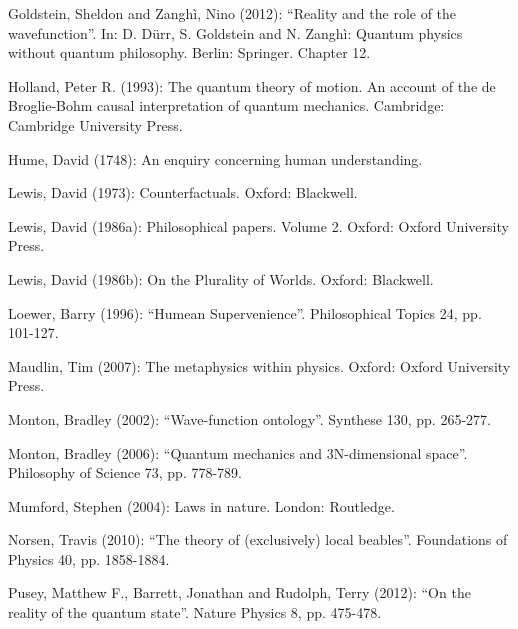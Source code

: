 \documentclass[12pt,a4paper]{article}
\theoremstyle{definition}
\begin{document}
{\vspace{0.3cm}   \noindent  Goldstein, Sheldon and Zangh\`i, Nino (2012): ``Reality and the role of the wavefunction''. In: D. D\"urr, S. Goldstein and N. Zangh\`i: Quantum physics without quantum philosophy. Berlin: Springer. Chapter 12.

\vspace{0.3cm}   \noindent  Holland, Peter R. (1993): The quantum theory of motion. An account of the de Broglie-Bohm causal interpretation of quantum mechanics. Cambridge: Cambridge University Press. 

\vspace{0.3cm}   \noindent  Hume, David (1748): An enquiry concerning human understanding. 

\vspace{0.3cm}   \noindent  Lewis, David (1973): Counterfactuals. Oxford: Blackwell. 

\vspace{0.3cm}   \noindent  Lewis, David (1986a): Philosophical papers. Volume 2. Oxford: Oxford University Press. 

\vspace{0.3cm}   \noindent  Lewis, David (1986b): On the Plurality of Worlds. Oxford: Blackwell. 

\vspace{0.3cm}   \noindent  Loewer, Barry (1996): ``Humean Supervenience''. Philosophical Topics 24, pp. 101-127. 

\vspace{0.3cm}   \noindent  Maudlin, Tim (2007): The metaphysics within physics. Oxford: Oxford University Press.

\vspace{0.3cm}   \noindent  Monton, Bradley (2002): ``Wave-function ontology''. Synthese 130, pp. 265-277. 

\vspace{0.3cm}   \noindent  Monton, Bradley (2006): ``Quantum mechanics and 3N-dimensional space''. Philosophy of Science 73, pp. 778-789.

\vspace{0.3cm}   \noindent  Mumford, Stephen (2004): Laws in nature. London: Routledge. 

\vspace{0.3cm}   \noindent  Norsen, Travis (2010): ``The theory of (exclusively) local beables''. Foundations of Physics 40, pp. 1858-1884.

\vspace{0.3cm}   \noindent  Pusey, Matthew F., Barrett, Jonathan and Rudolph, Terry (2012): ``On the reality of the quantum state''. Nature Physics 8, pp. 475-478. 

}
\end{document}
